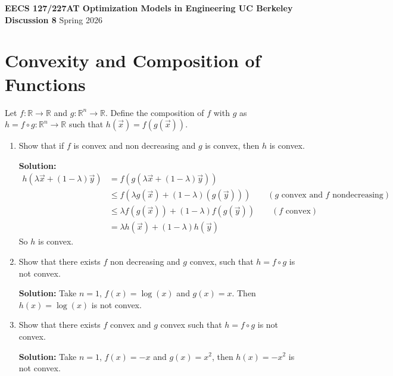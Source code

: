 \documentclass[10pt]{article}
\newcommand{\RR}{\mathbb{R}}
\begin{document}
\begin{center}
{\large\bfseries EECS 127/227AT \hfill Optimization Models in Engineering \hfill UC Berkeley}\\[4pt]
{\Large\bfseries Discussion 8} \hfill {\large Spring 2026}
\end{center}

\vspace{1em}

\section{Convexity and Composition of Functions}

Let $f : \RR \to \RR$ and $g : \RR^n \to \RR$. Define the composition of $f$ with $g$ as $h = f \circ g : \RR^n \to \RR$ such that
$h(\vec{x}) = f(g(\vec{x}))$.

\begin{enumerate}[label=(\alph*)]
    \item Show that if $f$ is convex and non decreasing and $g$ is convex, then $h$ is convex.

    \textbf{Solution:}
    \begin{align}
        h(\lambda \vec{x} + (1 - \lambda)\vec{y}) &= f(g(\lambda \vec{x} + (1 - \lambda)\vec{y})) \\
        &\leq f(\lambda g(\vec{x}) + (1 - \lambda)(g(\vec{y}))) \qquad (g \text{ convex and } f \text{ nondecreasing}) \\
        &\leq \lambda f(g(\vec{x})) + (1 - \lambda) f(g(\vec{y})) \qquad (f \text{ convex}) \\
        &= \lambda h(\vec{x}) + (1 - \lambda) h(\vec{y})
    \end{align}
    So $h$ is convex.

    \item Show that there exists $f$ non decreasing and $g$ convex, such that $h = f \circ g$ is not convex.

    \textbf{Solution:} Take $n = 1$, $f(x) = \log(x)$ and $g(x) = x$. Then $h(x) = \log(x)$ is not convex.

    \item Show that there exists $f$ convex and $g$ convex such that $h = f \circ g$ is not convex.

    \textbf{Solution:} Take $n = 1$, $f(x) = -x$ and $g(x) = x^2$, then $h(x) = -x^2$ is not convex.
\end{enumerate}

\newpage
\end{document}
